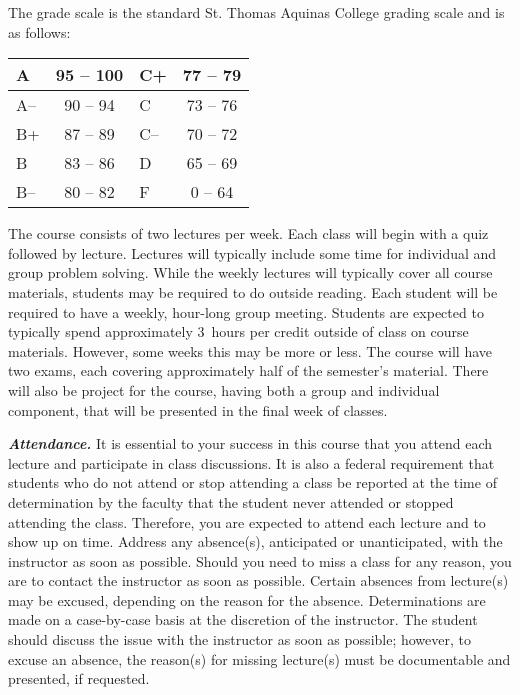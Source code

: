 \documentclass[11pt,letterpaper]{article}
\begin{document}
The grade scale is the standard St. Thomas Aquinas College grading scale and is as follows: \par
        \begin{table}[!ht]
        \centering
        \begin{tabular}{|l||c|l||c|} \hline
        A & 95 -- 100 & C+ & 77 -- 79 \\ \hline
        A-- & 90 -- 94 & C & 73 -- 76 \\ \hline
        B+ & 87 -- 89 & C-- & 70 -- 72 \\ \hline
        B & 83 -- 86 & D & 65 -- 69 \\ \hline
        B-- & 80 -- 82 & F & 0 -- 64 \\ \hline
        \end{tabular}
        \end{table}
\sectionbreak



The course consists of two lectures per week. Each class will begin with a quiz followed by lecture. Lectures will typically include some time for individual and group problem solving. While the weekly lectures will typically cover all course materials, students may be required to do outside reading. Each student will be required to have a weekly, hour-long group meeting. Students are expected to typically spend approximately 3~hours per credit outside of class on course materials. However, some weeks this may be more or less. The course will have two exams, each covering approximately half of the semester's material. There will also be project for the course, having both a group and individual component, that will be presented in the final week of classes. 
\sectionbreak



{\itshape\bfseries\color{stacred}Attendance.} It is essential to your success in this course that you attend each lecture and participate in class discussions. It is also a federal requirement that students who do not attend or stop attending a class be reported at the time of determination by the faculty that the student never attended or stopped attending the class. Therefore, you are expected to attend each lecture and to show up on time. Address any absence(s), anticipated or unanticipated, with the instructor as soon as possible. Should you need to miss a class for any reason, you are to contact the instructor as soon as possible. Certain absences from lecture(s) may be excused, depending on the reason for the absence. Determinations are made on a case-by-case basis at the discretion of the instructor. The student should discuss the issue with the instructor as soon as possible; however, to excuse an absence, the reason(s) for missing lecture(s) must be documentable and presented, if requested. \pspace
\end{document}
